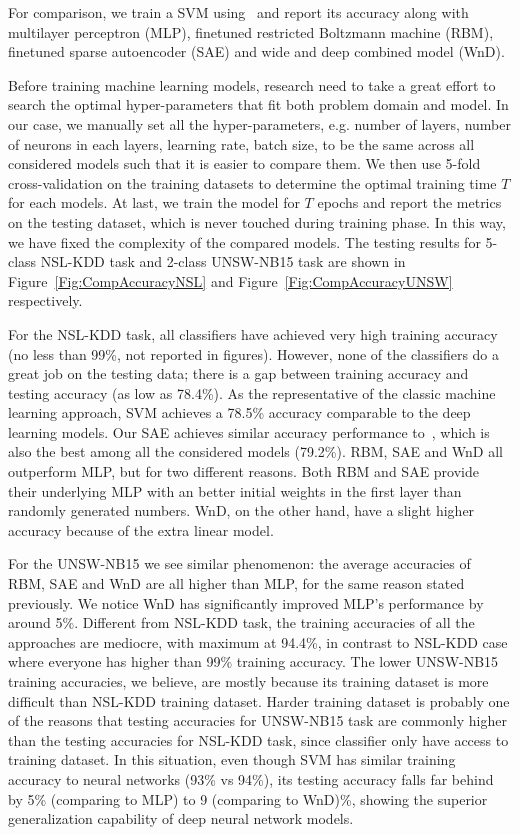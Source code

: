 For comparison, we train a SVM using~\cite{ScikitLearnSVM} and report its accuracy along
with multilayer perceptron (MLP), finetuned restricted Boltzmann machine (RBM),
finetuned sparse autoencoder (SAE) and wide and deep combined model (WnD).

Before training machine learning models, research need to take a great effort to search
the optimal hyper-parameters that fit both problem domain and model.
In our case, we manually set all the hyper-parameters, e.g. number of layers, number of neurons
in each layers, learning rate, batch size, to be the same across all considered models such that
it is easier to compare them.
We then use 5-fold cross-validation on the training datasets to determine the optimal training time $T$
for each models.
At last, we train the model for $T$ epochs and report the metrics on the testing dataset,
which is never touched during training phase.
In this way, we have fixed the complexity of the compared models.
The testing results for 5-class NSL-KDD task and 2-class UNSW-NB15 task are
shown in Figure~\ref{Fig:CompAccuracyNSL} and Figure~\ref{Fig:CompAccuracyUNSW} respectively.

For the NSL-KDD task, all classifiers have achieved very high training accuracy (no less than 99\%, not reported in figures).
However, none of the classifiers do a great job on the testing data;
there is a gap between training accuracy and testing accuracy (as low as 78.4\%).
As the representative of the classic machine learning approach, SVM achieves a 78.5\% accuracy
comparable to the deep learning models.
Our SAE achieves similar accuracy performance to~\cite{STL-NIDS}, which is
also the best among all the considered models (79.2\%).
RBM, SAE and WnD all outperform MLP, but for two different reasons.
Both RBM and SAE provide their underlying MLP with an better initial weights in the first layer
than randomly generated numbers.
WnD, on the other hand, have a slight higher accuracy because of the extra linear model.

For the UNSW-NB15 we see similar phenomenon: the average accuracies of RBM, SAE and WnD are
all higher than MLP, for the same reason stated previously.
We notice WnD has significantly improved MLP's performance by around 5\%.
Different from NSL-KDD task, the training accuracies of all the approaches are mediocre,
with maximum at 94.4\%, in contrast to NSL-KDD case where everyone has higher than 99\% training accuracy.
The lower UNSW-NB15 training accuracies, we believe, are mostly because its training dataset
is more difficult than NSL-KDD training dataset.
Harder training dataset is probably one of the reasons that testing accuracies for UNSW-NB15 task
are commonly higher than the testing accuracies for NSL-KDD task,
since classifier only have access to training dataset.
In this situation, even though SVM has similar training accuracy to neural networks (93\% vs 94\%),
its testing accuracy falls far behind by 5\% (comparing to MLP) to 9 (comparing to WnD)\%,
showing the superior generalization capability of deep neural network models.

